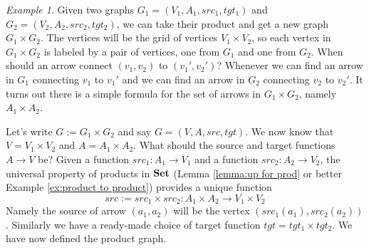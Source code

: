\documentclass{book}
\def\to{\rightarrow}
\def\taking{\colon}
\def\Set{{\bf Set}}
\theoremstyle{remark}
\newtheorem{example}[subsubsection]{Example}
\theoremstyle{definition}
\begin{document}
\begin{example}\label{ex:product of graphs}
Given two graphs $G_1=(V_1,A_1,src_1,tgt_1)$ and $G_2=(V_2,A_2,src_2,tgt_2)$, we can take their product and get a new graph $G_1\times G_2$. The vertices will be the grid of vertices $V_1\times V_2$, so each vertex in $G_1\times G_2$ is labeled by a pair of vertices, one from $G_1$ and one from $G_2$. When should an arrow connect $(v_1,v_2)$ to $(v_1',v_2')$? Whenever we can find an arrow in $G_1$ connecting $v_1$ to $v_1'$ and we can find an arrow in $G_2$ connecting $v_2$ to $v_2'$. It turns out there is a simple formula for the set of arrows in $G_1\times G_2$, namely $A_1\times A_2$.

Let's write $G:=G_1\times G_2$ and say $G=(V,A,src,tgt)$. We now know that $V=V_1\times V_2$ and $A=A_1\times A_2$. What should the source and target functions $A\to V$ be? Given a function $src_1\taking A_1\to V_1$ and a function $src_2\taking A_2\to V_2$, the universal property of products in $\Set$ (Lemma \ref{lemma:up for prod} or better Example \ref{ex:product to product}) provides a unique function 
$$src:=src_1\times src_2\taking A_1\times A_2\to V_1\times V_2$$ 
Namely the source of arrow $(a_1,a_2)$ will be the vertex $(src_1(a_1),src_2(a_2))$. Similarly we have a ready-made choice of target function $tgt=tgt_1\times tgt_2$. We have now defined the product graph.


\end{example}
\end{document}
